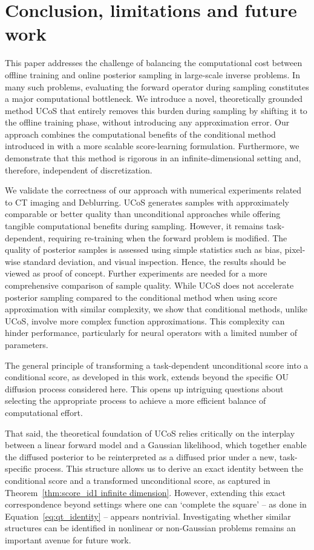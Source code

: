 \documentclass[10pt]{article} %
\def\Eqref#1{Equation~\ref{#1}}
\theoremstyle{plain}
\theoremstyle{definition}
\theoremstyle{remark}
\newcommand{\fabian}[1]{{#1}}%
\newcommand{\lam}[1]{{ #1}}
\newcommand{\duclam}[1]{#1}%
\begin{document}
\section{Conclusion, limitations and future work}
%
This paper addresses the challenge of balancing the computational cost between offline training and online posterior sampling in large-scale inverse problems. In many such problems, evaluating the forward operator during sampling constitutes a major computational bottleneck. We introduce a novel, theoretically grounded method UCoS that entirely removes this burden during sampling by shifting it to the offline training phase, without introducing any approximation error. Our approach combines the computational benefits of the conditional method introduced in \citet{baldassari2024conditional} with a more scalable score-learning formulation. Furthermore, we demonstrate that this method is rigorous in an infinite-dimensional setting and, therefore, independent of discretization.

\fabian{We validate the correctness of our approach with numerical experiments related to CT imaging and Deblurring. UCoS generates samples with approximately comparable or better quality than unconditional approaches while offering tangible computational benefits during sampling. However, it remains task-dependent, requiring re-training when the forward problem is modified. \lam{The quality of posterior samples is assessed using simple statistics such as bias, pixel-wise standard deviation, and visual inspection. Hence, the results should be viewed as proof of concept. Further experiments are needed for a more comprehensive comparison of sample quality.}
While UCoS does not accelerate posterior sampling compared to the conditional method when using score approximation with similar complexity, we show that conditional methods, unlike UCoS, involve more complex function approximations. This complexity can hinder performance, particularly for neural operators with a limited number of parameters.}

The general principle of transforming a task-dependent unconditional score into a conditional score, as developed in this work, extends beyond the specific OU diffusion process considered here. This opens up intriguing questions about selecting the appropriate process to achieve a more efficient balance of computational effort.

%

\duclam{That said, the theoretical foundation of UCoS relies critically on the interplay between a linear forward model and a Gaussian likelihood, which together enable the diffused posterior to be reinterpreted as a diffused prior under a new, task-specific process. This structure allows us to derive an exact identity between the conditional score and a transformed unconditional score, as captured in Theorem~\ref{thm:score_id1 infinite dimension}. However, extending this exact correspondence beyond settings where one can `complete the square' -- as done in \Eqref{eq:qt_identity} -- appears nontrivial. Investigating whether similar structures can be identified in nonlinear or non-Gaussian problems remains an important avenue for future work.
}
\end{document}

